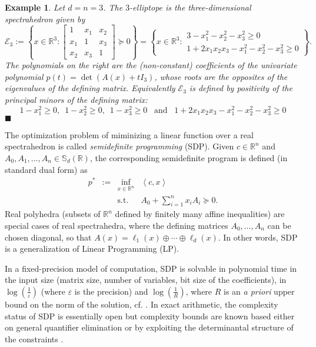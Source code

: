 \documentclass[a4paper,12pt]{article}
\newtheorem{example}{Example}
\newcommand{\R}{\mathbb{R}} %
\newcommand{\sym}{\mathbb{S}} %
\newcommand{\exend}{\hfill $\blacksquare$}
\begin{document}
\begin{example}\label{ell3}
  Let $d=n=3$. The $3$-elliptope is the three-dimensional spectrahedron given by
  $$
  \mathcal{E}_3 :=
  \left\{
  x
  \in \R^3 :
  \begin{bmatrix}
    1 & x_1 & x_2 \\
    x_1 & 1 & x_3 \\
    x_2 & x_3 & 1
  \end{bmatrix}
  \succeq 0
  \right\}
  =
  \left\{
  x
  \in \R^3 :
  \begin{array}{r}
    3-x_1^2-x_2^2-x_3^2 \geq 0 \\
    1+2x_1x_2x_3-x_1^2-x_2^2-x_3^2 \geq 0
  \end{array}
  \right\}.
  $$
  The polynomials on the right are the (non-constant) coefficients of the univariate polynomial
  $p(t) = \det(A(x)+t I_3)$,
  whose roots are the opposites of the eigenvalues of the defining matrix. Equivalently $\mathcal{E}_3$
  is defined by positivity of the principal minors of the defining matrix:
  $$
  1-x_1^2 \geq 0, \,\,\, 1-x_2^2 \geq 0, \,\,\, 1-x_3^2 \geq 0 \,\,\, \text{ and } \,\,\, 1+2x_1x_2x_3-x_1^2-x_2^2-x_3^2 \geq 0
  $$
  \exend
\end{example}

The optimization problem of miminizing a linear function over a real spectrahedron is called {\it semidefinite programming} (SDP). Given $c \in \R^n$ and $A_0,A_1,\ldots,A_n \in \sym_d(\R)$, the corresponding semidefinite program is defined (in standard dual form) as
\begin{equation}
  \label{SDP}
\begin{array}{rcll}
  p^* & := & \inf_{x \in \R^n} & \left\langle c, x \right\rangle \\
  &    & \text{s.t.}         & A_0+\sum_{i=1}^n x_i A_i \succeq 0.
\end{array}
\end{equation}
Real polyhedra (subsets of $\R^n$ defined by finitely many affine inequalities) are special cases of real
spectrahedra, where the defining matrices $A_0, \ldots, A_n$ can be chosen diagonal, so that $A(x) =
\ell_1(x) \oplus \cdots \oplus \ell_d(x)$. In other words, SDP is a generalization of Linear Programming (LP).

In a fixed-precision model of computation, SDP is solvable in polynomial time in the input size (matrix size,
number of variables, bit size of the coefficients), in $\log(\frac{1}{\varepsilon})$ (where $\varepsilon$ is the
precision) and $\log(\frac{1}{R})$, where $R$ is an {\it a priori} upper bound on the norm of the solution,
cf. \cite[Sec.1.9]{deKlerk}. In exact arithmetic, the complexity status of SDP is essentially open but complexity
bounds are known based either on general quantifier elimination \cite{ramana1997exact,porkolab1997complexity}
or by exploiting the determinantal structure of the constraints \cite{henrion2016exact}.
\end{document}
